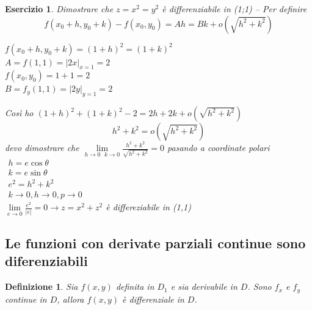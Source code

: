 \documentclass{book}
\newtheorem{esercizio}{Esercizio}
\newtheorem{defi}{Definizione}
\newcommand{\abs}[1]{\lvert#1\rvert}
\begin{document}
\begin{esercizio}
  Dimostrare che $z=x^2=y^2$ è differenziabile in (1;1) -- Per definire
  \begin{equation*}
    f(x_0+h,y_0+k)-f(x_0,y_0)=Ah=Bk+o(\sqrt{h^2+k^2})
  \end{equation*}
  \begin{multicols}{2}
    $f(x_0+h,y_0+k)=(1+h)^2=(1+k)^2$\\
    $A=f(1,1)=\abs{2x}_{x=1}=2$\\
    $f(x_0,y_0)=1+1=2$\\
    $B=f_y(1,1)=\abs{2y}_{y=1}=2$
  \end{multicols}
  Così ho $(1+h)^2+(1+k)^2-2=2h+2k+o(\sqrt{h^2+k^2})$
  \begin{equation*}
    h^2+k^2=o(\sqrt{h^2+k^2})
  \end{equation*}
  devo dimostrare che $\lim\limits_{h\to 0\text{ } k\to0}\frac{h^2+k^2}{\sqrt{h^2+k^2}}=0$ pasando
  a coordinate polari $\begin{matrix} h=e\cos \theta\\ k=e\sin \theta\\ e^2=h^2+k^2\\ k\to 0,h\to 0,
                         p\to 0\end{matrix}$\\ 
                       $\lim\limits_{e\to 0}\frac{e^2}{\abs e}=0 \to z=x^2+z^2$ è differeziabile in (1,1)
\end{esercizio}
\subsection{Le funzioni con derivate parziali continue sono diferenziabili}
\begin{defi}
  Sia $f(x,y)$ definita in $D_1$ e sia derivabile in $D$. Sono $f_x$ e $f_y$ continue in $D$, allora
  $f(x,y)$ è differenziale in $D$.
\end{defi}
\end{document}
